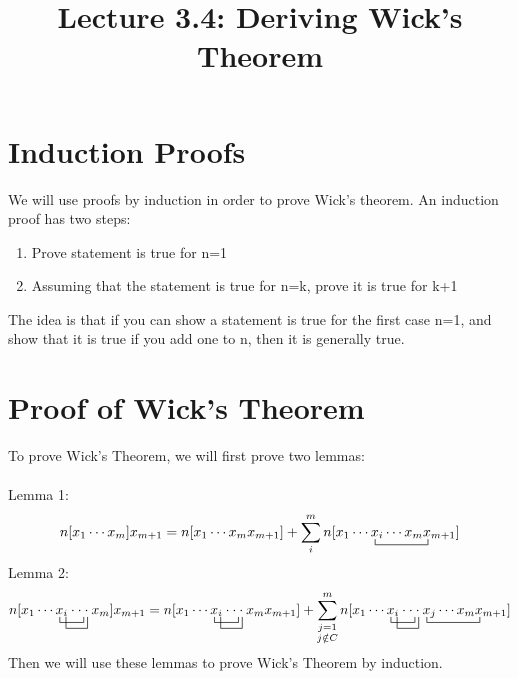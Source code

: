 \documentclass{article}
\title{Lecture 3.4: Deriving Wick's Theorem}
\date{}
\newcommand{\ctr}{\bcontraction}
\newcommand{\cd}{\ensuremath{\cdots} }
\begin{document}
\maketitle
\noindent
\section{Induction Proofs}
We will use proofs by induction in order to prove Wick's theorem. 
An induction proof has two steps: 
\begin{enumerate}
\item Prove statement is true for n=1
\item Assuming that the statement is true for n=k, prove it is true for k+1
\end{enumerate}
The idea is that if you can show a statement is true for the first case n=1, 
and show that it is true if you add one to n, then it is generally true. 

\section{Proof of Wick's Theorem}

To prove Wick's Theorem, we will first prove two lemmas:\\ \\
Lemma 1: 
\[n[x_1 \cd x_m]x_{m+1} = n[x_1 \cd x_m x_{m+1}] + \sum_i^m n[\ctr{x_1 \cd}{x}{{}_i \cd x_m}{x} x_1 \cd x_i \cd x_m x_{m+1}]\]
Lemma 2: 
\[n[\ctr{x_1 \cd}{x}{{}_i \cdot}{\cdot}
\ctr[2ex]{x_1 \cd x }{{}_i }{\cdot \cdot}{\cdot}
x_1 \cd x_i \cdot \cdot \cdot x_m]x_{m+1}  = 
n[\ctr{x_1 \cd}{x}{{}_i \cdot}{\cdot}
\ctr[2ex]{x_1 \cd x }{{}_i }{\cdot \cdot}{\cdot}
x_1 \cd x_i \cdot \cdot \cdot x_m x_{m+1} ] + 
\sum_{\substack{j = 1 \\ j \notin C}}^m n[\ctr{x_1 \cd}{x}{{}_i \cdot}{\cdot}
\ctr[2ex]{x_1 \cd x }{{}_i }{\cdot \cdot}{\cdot}
\ctr{x_1 \cd x_i \cdot \cdot \cdot }{x}{{}_j \cd  x_m }{x}
x_1 \cd x_i \cdot \cdot \cdot x_j \cd x_m x_{m+1} ] 
\]
Then we will use these lemmas to prove Wick's Theorem by induction.
\end{document}
